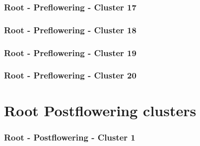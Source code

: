 \subsubsection{Root - Preflowering - Cluster 17}

\vspace{1em}



\clearpage

\subsubsection{Root - Preflowering - Cluster 18}

\vspace{1em}



\clearpage

\subsubsection{Root - Preflowering - Cluster 19}

\vspace{1em}



\clearpage

\subsubsection{Root - Preflowering - Cluster 20}

\vspace{1em}



\clearpage

\section{Root Postflowering clusters}

\subsubsection{Root - Postflowering - Cluster 1}

\vspace{1em}

